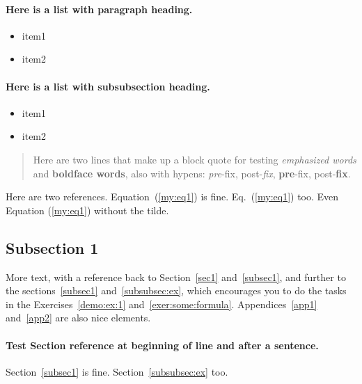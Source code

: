 \n\documentclass[%
oneside,                 %
final,                   %
10pt]{article}
\theoremstyle{definition}
\begin{document}
\noindent
\paragraph{Here is a list with paragraph heading.}

\begin{itemize}
  \item item1

  \item item2
\end{itemize}

\noindent
\paragraph{Here is a list with subsubsection heading.}
\begin{itemize}
  \item item1

  \item item2
\end{itemize}

\noindent

\begin{quote}
Here are two lines that make up
a block quote for testing \emph{emphasized words} and \textbf{boldface words},
also with hypens:
\emph{pre}-fix, post-\emph{fix}, \textbf{pre}-fix, post-\textbf{fix}.
\end{quote}


Here are two references. Equation~(\ref{my:eq1}) is fine. Eq.~(\ref{my:eq1}) too.
Even Equation (\ref{my:eq1}) without the tilde.

\subsection{Subsection 1}
\label{subsec1}



More text, with a reference back to
Section~\vref{sec1} and~\vref{subsec1}, and further to the
sections~\vref{subsec1} and~\vref{subsubsec:ex}, which
encourages you to do the tasks in the
Exercises~\vref{demo:ex:1} and~\vref{exer:some:formula}.
Appendices~\vref{app1} and~\vref{app2} are also nice elements.

\paragraph{Test Section reference at beginning of line and after a sentence.}
Section~\vref{subsec1} is fine.
Section~\vref{subsubsec:ex} too.
\end{document}

